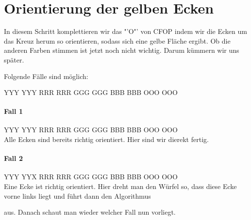 \section{Orientierung der gelben Ecken}
\parbox{0.7\linewidth}{
In diesem Schritt komplettieren wir das "'O"' von CFOP indem wir die Ecken um das Kreuz herum so orientieren, sodass sich eine gelbe Fläche ergibt.
Ob die anderen Farben stimmen ist jetzt noch nicht wichtig.
Darum kümmern wir uns später.

Folgende Fälle sind möglich:
}
\RubikCubeGreyAll%
            {Y}{Y}{Y}
            {Y}{Y}{Y}%
               {R}{R}{R}
	       {R}{R}{R}%
	       {G}{G}{G}
	       {G}{G}{G}%
	      {B}{B}{B}
	      {B}{B}{B}%
	      {O}{O}{O}
	      {O}{O}{O}%
\\[1em]

\paragraph{Fall 1}
\RubikCubeGreyAll%
            {Y}{Y}{Y}
            {Y}{Y}{Y}%
               {R}{R}{R}
	       {R}{R}{R}%
	       {G}{G}{G}
	       {G}{G}{G}%
	      {B}{B}{B}
	      {B}{B}{B}%
	      {O}{O}{O}
	      {O}{O}{O}%
\\[1em]
Alle Ecken sind bereits richtig orientiert. Hier sind wir dierekt fertig.

\paragraph{Fall 2}
\RubikCubeGreyAll%
            {Y}{Y}{Y}
            {Y}{Y}{X}%
               {R}{R}{R}
	       {R}{R}{R}%
	       {G}{G}{G}
	       {G}{G}{G}%
	      {B}{B}{B}
	      {B}{B}{B}%
	      {O}{O}{O}
	      {O}{O}{O}%
\\[1em]
Eine Ecke ist richtig orientiert. Hier dreht man den Würfel so, dass diese
Ecke vorne links liegt und führt dann den Algorithmus
\begin{center}
\end{center}
aus. Danach schaut man wieder welcher Fall nun vorliegt.

